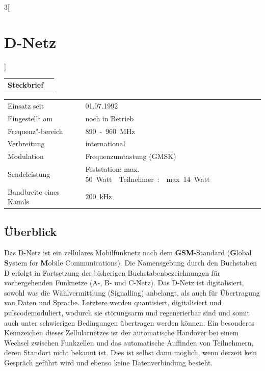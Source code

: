 \begin{multicols}{3}[\section{D-Netz}]


\newrefsegment

\begin{tabular}{p{}p{2.7 cm}}
\textbf{Steckbrief}& \\
\end{tabular}
\begin{tabular}{p{}p{2.7 cm}}
      Einsatz seit & 01.07.1992 \\
	  Eingestellt am & noch in Betrieb\\
      Frequenz"-bereich  & \SI{890} - \SI{960}{\mega\hertz} \\
      Verbreitung & international \\
      Modulation & Frequenzumtastung (GMSK) \\
      Sendeleistung & Feststation: \newline max. \SI{50} Watt \newline
				      Teilnehmer: \newline max. \SI{14} Watt \\
	  Bandbreite eines Kanals & \SI{200}{\kilo\hertz}\\
\end{tabular}
\par


\subsection*{Überblick}
Das D-Netz ist ein zellulares Mobilfunknetz nach dem \textbf{GSM}-Standard (\textbf{G}lobal \textbf{S}ystem for \textbf{M}obile Communications). Die Namensgebung durch den Buchstaben D erfolgt in Fortsetzung der bisherigen Buchstabenbezeichnungen für  vorhergehenden Funknetze (A-, B- und C-Netz).
Das D-Netz ist digitalisiert, sowohl was die Wählvermittlung (Signalling) anbelangt, als auch für Übertragung von Daten und Sprache. Letztere werden quantisiert, digitalisiert und pulscodemoduliert, wodurch sie störungsarm und regenerierbar sind und somit auch unter schwierigen Bedingungen übertragen werden können. Ein besonderes Kennzeichen dieses Zellularnetzes ist der automatische Handover bei einem Wechsel zwischen Funkzellen und das automatische Auffinden von Teilnehmern, deren Standort nicht bekannt ist. Dies ist selbst dann möglich, wenn derzeit kein Gespräch geführt wird und ebenso keine Datenverbindung besteht.


\end{multicols}
